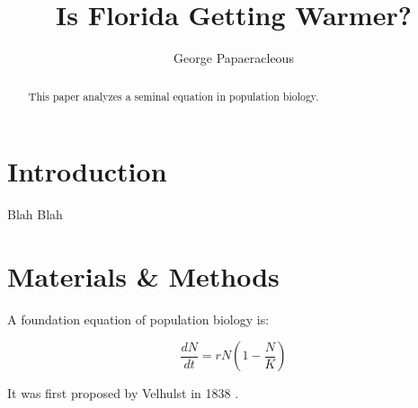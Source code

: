 \documentclass[12pt]{article}
\title{Is Florida Getting Warmer?}
\author{George Papaeracleous}
\date{}
\begin{document}
  \maketitle

  \begin{abstract}
    This paper analyzes a seminal equation in population biology.
  \end{abstract}

  \section{Introduction}
    Blah Blah

  \section{Materials \& Methods}
  A foundation equation of population biology is:

  \begin{equation}
    \frac{dN}{dt} = rN (1 - \frac{N}{K})
  \end{equation}

  It was first proposed by Velhulst in 1838 \cite{verhulst1838notice}.

  

  
\end{document}
